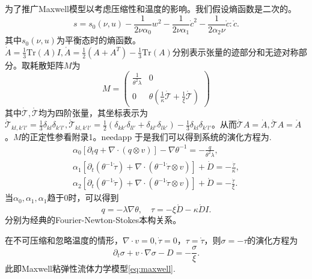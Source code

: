 \documentclass{article}
\begin{document}
	为了推广Maxwell模型以考虑压缩性和温度的影响。我们假设熵函数是二次的。
	\begin{equation*}
		s = s_0(\nu,u)  - \frac{1}{2\nu \alpha_0} w^2 - \frac{1}{2\nu \alpha_1} \dot{c}^2- \frac{1}{2\alpha_2 \nu} \mathring{c}:\mathring{c}.
	\end{equation*}
	其中$s_0(\nu,u)$为平衡态时的熵函数。$\dot{A} = \frac{1}{3} \mbox{Tr} (A)I, \mathring{A} = \frac{1}{2} (A + A^T) - \frac{1}{3} \mbox{Tr} (A) $分别表示张量的迹部分和无迹对称部分。取耗散矩阵$M$为
	\begin{equation*}
		M = \left( \begin{array}{ccc} 
			\frac{1}{\theta^2 \lambda} & 0 \\
			0 &  \theta(\frac{1}{\kappa} \dot{\mathcal{T}} + \frac{1}{\xi} \mathring{\mathcal{T}})  
		\end{array} \right)
	\end{equation*}
	其中$\dot{\mathcal{T}}, \mathring{\mathcal{T}}$均为四阶张量，其坐标表示为$\dot{\mathcal{T}}_{kl,k'l'} = \frac{1}{3}\delta_{kl} \delta_{k'l'}, \mathring{\mathcal{T}}_{kl,k'l'} =\frac{1}{2}(\delta_{kk'}\delta_{ll'} + \delta_{kl'} \delta_{lk'} ) -\frac{1}{3}\delta_{kl} \delta_{k'l'} $。从而$\dot{\mathcal{T}} A = \dot{A},\mathring{\mathcal{T}} A = \mathring{A}$。$M$的正定性参看附录1。needapp
	于是我们可以得到系统的演化方程为\cite{}.
	\begin{subequations}\label{eq:CDFMaxwell}
		\begin{align}
			\alpha_0 [\partial_t q +  \nabla \cdot (q \otimes v)] - \nabla \theta^{-1} = -\frac{q}{\theta^2 \lambda}, \\
			\alpha_1[\partial_t (\theta^{-1} \dot{\tau}) + \nabla \cdot (\theta^{-1} \dot{\tau} \otimes v)] + \dot{D} = -\frac{\dot{\tau}}{\kappa}, \\
			\alpha_2[\partial_t (\theta^{-1} \mathring{\tau}) + \nabla \cdot (\theta^{-1} \mathring{\tau} \otimes v)] + \mathring{D} = -\frac{\dot{\tau}}{\xi}. 
		\end{align}
	\end{subequations}
	当$\alpha_0, \alpha_1, \alpha_1$趋于0时，可以得到
	\begin{equation*}
		q = -\lambda \nabla \theta, \quad \tau = - \xi \mathring{D} - \kappa \dot{D} I.
	\end{equation*}
	分别为经典的Fourier-Newton-Stokes本构关系\cite{}。

	在不可压缩和忽略温度的情形，$\nabla \cdot v = 0, \dot{\tau}=0$，$\tau = \mathring{\tau}$，则$\sigma = -\tau$的演化方程为
	\begin{equation*}
		\partial_t \sigma + v \cdot \nabla \sigma - D = -\frac{\sigma}{\xi}. 
	\end{equation*}
	此即Maxwell粘弹性流体力学模型\eqref{eq:maxwell}.	
\end{document}
